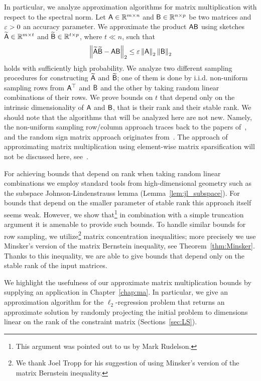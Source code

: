 %
In particular, we analyze approximation algorithms for matrix multiplication with respect to the spectral norm. Let ${\mathsf{A} }\in{\mathbb{R}^{m\times n}}$ and ${\mathsf{B} }\in{\mathbb{R}^{n \times p}}$ be two matrices and $\varepsilon>0$ an accuracy parameter. We approximate the product ${\mathsf{A} } {\mathsf{B} }$ using sketches $\widetilde{{\mathsf{A} }}\in{\mathbb{R}^{m\times t}}$ and $\widetilde{{\mathsf{B} }}\in{\mathbb{R}^{t\times p}}$, where $t\ll n$, such that
\begin{equation*}
 \left\|\widetilde{{\mathsf{A} }} \widetilde{{\mathsf{B} }} - {\mathsf{A} } {\mathsf{B} }\right\|_2 \leq \varepsilon \left\|{\mathsf{A} }\right\|_2\left\|{\mathsf{B} }\right\|_2
\end{equation*}
holds with sufficiently high probability. We analyze two different sampling procedures for constructing $\widetilde{{\mathsf{A} }}$ and $\widetilde{{\mathsf{B} }}$; one of them is done by i.i.d. non-uniform sampling rows from ${\mathsf{A} }^\top$ and ${\mathsf{B} }$ and the other by taking random linear combinations of their rows. We prove bounds on $t$ that depend only on the intrinsic dimensionality of ${\mathsf{A} }$ and ${\mathsf{B} }$, that is their rank and their stable rank. We should note that the algorithms that will be analyzed here are not new. Namely, the non-uniform sampling row/column approach traces back to the papers of~\cite{mm:Cohen,MM:focs,lowrank:rankone:VR}, and the random sign matrix approach originates from~\cite{sarlos}. The approach of approximating matrix multiplication using element-wise matrix sparsification will not be discussed here, see~\cite[Section 5]{matrixmult:drineas}.
%

%
For achieving bounds that depend on rank when taking random linear combinations we employ standard tools from high-dimensional geometry such as the subspace Johnson-Lindenstrauss lemma (Lemma~\ref{lem:jl_subspace}). For bounds that depend on the smaller parameter of stable rank this approach itself seems weak. However, we show that\footnote{This argument was pointed out to us by Mark Rudelson.} in combination with a simple truncation argument it is amenable to provide such bounds. To handle similar bounds for row sampling, we utilize\footnote{We thank Joel Tropp for his suggestion of using Minsker's version of the matrix Bernstein inequality.} matrix concentration inequalities; more precisely we use Minsker's version of the matrix Bernstein inequality, see Theorem~\ref{thm:Minsker}. Thanks to this inequality, we are able to give bounds that depend only on the stable rank of the input matrices.
%

%
We highlight the usefulness of our approximate matrix multiplication bounds by supplying an application in Chapter~\ref{chap:ma}. In particular, we give an approximation algorithm for the $\ell_2$-regression problem that returns an approximate solution by randomly projecting the initial problem to dimensions linear on the rank of the constraint matrix (Sections~\ref{sec:LS}).
%


